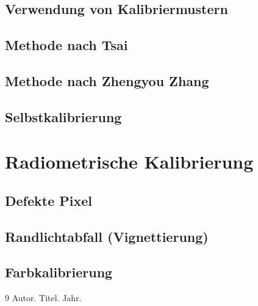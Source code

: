 \documentclass[12pt, a4paper, parskip=half]{scrartcl}
\begin{document}
\subsection{Verwendung von Kalibriermustern}
\subsection{Methode nach Tsai}
\subsection{Methode nach Zhengyou Zhang}
\subsection{Selbstkalibrierung}

\section{Radiometrische Kalibrierung}
\subsection{Defekte Pixel}
\subsection{Randlichtabfall (Vignettierung)}
\subsection{Farbkalibrierung}

\newpage
\begin{thebibliography}{9}
     Autor. Titel. Jahr.
\end{thebibliography}
\end{document}
